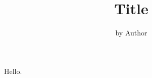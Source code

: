 \documentclass[12pt, letterpaper]{article}
\title{Title}
\author{by Author}
\begin{document}
\maketitle

Hello.
\end{document}
